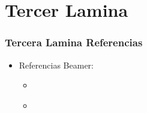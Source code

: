 \documentclass[11pt]{beamer}
\begin{document}
\section{Tercer Lamina}
\begin{frame}
\frametitle{Tercera Lamina Referencias}
\begin{itemize}
	\item Referencias Beamer:
		\begin{itemize}
			\item \href{https://es.overleaf.com/learn/latex/Beamer}{}
			\item \href{https://es.overleaf.com/learn/latex/Beamer\#Themes_and_colorthemes}{}
		\end{itemize}
\end{itemize}
\end{frame}

\end{document}
